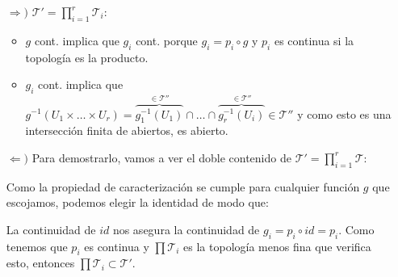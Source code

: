 \begin{demo}
\begin{enumerate}
    \item[$\Rightarrow)$] $\mathcal{T}' = \prod_{i = 1}^{r} \mathcal{T}_i: $ 
    \begin{itemize}
        \item $g$ cont. implica que $g_i$ cont. porque $g_i = p_i \circ g$ y $p_i$ es continua si la topología es la producto.
        \item $g_i$ cont. implica que $g^{-1}\left( U_1 \times \ldots \times U_r \right) = \overbrace{g_1^{-1}\left( U_1 \right)}^{\in \mathcal{T}''} \cap \ldots \cap \overbrace{g_r^{-1}\left( U_i \right)}^{\in \mathcal{T}''} \in \mathcal{T}''$ y como esto es una intersección finita de abiertos, es abierto.
    \end{itemize}

    \item[$\Leftarrow)$] Para demostrarlo, vamos a ver el doble contenido de $\mathcal{T}' = \prod_{i=1}^{r} \mathcal{T}$:
    
    Como la propiedad de caracterización se cumple para cualquier función $g$ que escojamos, podemos elegir la identidad de modo que:
    \begin{figure}[H]
        \centering    
    \end{figure}
    La continuidad de $id$ nos asegura la continuidad de $g_i = p_i \circ id = p_i$. Como tenemos que $p_i$ es continua y $\prod \mathcal{T}_i$ es la topología menos fina que verifica esto, entonces $\prod \mathcal{T}_i \subset \mathcal{T}'$.
    

\end{enumerate}
\end{demo}
